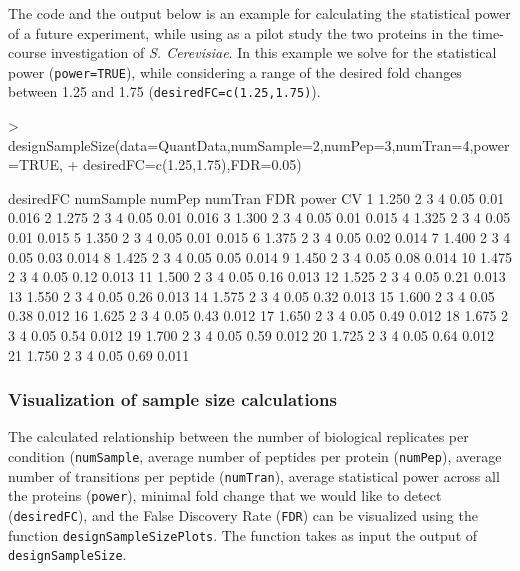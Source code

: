 \documentclass[11pt]{article}
\begin{document}
The code and the output  below is an example for calculating the statistical power of a future experiment, while using as a pilot study the two proteins in the  time-course investigation of {\it S. Cerevisiae}. In this example we solve for the statistical power ({\tt power=TRUE}), while considering a range of the desired fold changes between 1.25 and 1.75 ({\tt desiredFC=c(1.25,1.75)}).

\begin{small}
\begin{Schunk}
\begin{Sinput}
> designSampleSize(data=QuantData,numSample=2,numPep=3,numTran=4,power=TRUE,
+                  desiredFC=c(1.25,1.75),FDR=0.05)
\end{Sinput}
\begin{Soutput}
   desiredFC numSample numPep numTran  FDR power    CV
1      1.250         2      3       4 0.05  0.01 0.016
2      1.275         2      3       4 0.05  0.01 0.016
3      1.300         2      3       4 0.05  0.01 0.015
4      1.325         2      3       4 0.05  0.01 0.015
5      1.350         2      3       4 0.05  0.01 0.015
6      1.375         2      3       4 0.05  0.02 0.014
7      1.400         2      3       4 0.05  0.03 0.014
8      1.425         2      3       4 0.05  0.05 0.014
9      1.450         2      3       4 0.05  0.08 0.014
10     1.475         2      3       4 0.05  0.12 0.013
11     1.500         2      3       4 0.05  0.16 0.013
12     1.525         2      3       4 0.05  0.21 0.013
13     1.550         2      3       4 0.05  0.26 0.013
14     1.575         2      3       4 0.05  0.32 0.013
15     1.600         2      3       4 0.05  0.38 0.012
16     1.625         2      3       4 0.05  0.43 0.012
17     1.650         2      3       4 0.05  0.49 0.012
18     1.675         2      3       4 0.05  0.54 0.012
19     1.700         2      3       4 0.05  0.59 0.012
20     1.725         2      3       4 0.05  0.64 0.012
21     1.750         2      3       4 0.05  0.69 0.011
\end{Soutput}
\end{Schunk}
\end{small}


\subsubsection{Visualization of sample size calculations}

The calculated relationship between the number of biological replicates per condition ({\tt numSample}, average number of peptides per protein ({\tt numPep}), average number of transitions per peptide ({\tt numTran}), average statistical power across all the proteins ({\tt power}), minimal fold change that we would like to detect ({\tt desiredFC}), and the False Discovery Rate ({\tt FDR}) can be visualized using the function {\tt designSampleSizePlots}. The function takes as input the output of {\tt designSampleSize}.
\end{document}

